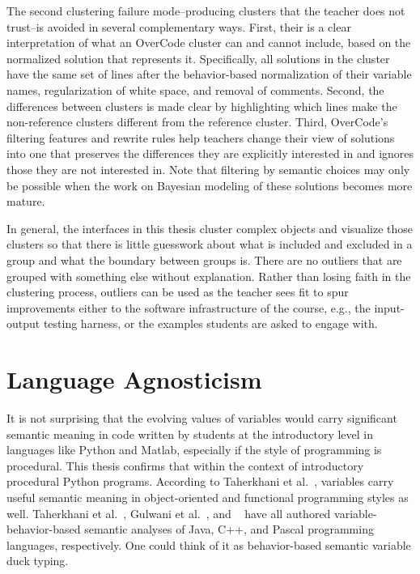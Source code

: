 

The second clustering failure mode--producing clusters that the teacher does not trust--is avoided in several complementary ways. First, their is a clear interpretation of what an OverCode cluster can and cannot include, based on the normalized solution that represents it. Specifically, all solutions in the cluster have the same set of lines after the behavior-based normalization of their variable names, regularization of white space, and removal of comments. Second, the differences between clusters is made clear by highlighting which lines make the non-reference clusters different from the reference cluster. Third, OverCode's filtering features and rewrite rules help teachers change their view of solutions into one that preserves the differences they are explicitly interested in and ignores those they are not interested in. Note that filtering by semantic choices may only be possible when the work on Bayesian modeling of these solutions becomes more mature. 


In general, the interfaces in this thesis cluster complex objects and visualize those clusters so that there is little guesswork about what is included and excluded in a group and what the boundary between groups is. There are no outliers that are grouped with something else without explanation. Rather than losing faith in the clustering process, outliers can be used as the teacher sees fit to spur improvements either to the software infrastructure of the course, e.g., the input-output testing harness, or the examples students are asked to engage with. 

\section{Language Agnosticism}

It is not surprising that the evolving values of variables would carry significant semantic meaning in code written by students at the introductory level in languages like Python and Matlab, especially if the style of programming is procedural. This thesis confirms that within the context of introductory procedural Python programs. According to Taherkhani et al.~\cite{taherkhani2010recognizing}, variables carry useful semantic meaning in object-oriented and functional programming styles as well. Taherkhani et al.~\cite{}, Gulwani et al.~\cite{gulwani_fse14}, and ~\cite{sajaniemi2002empirical} have all authored variable-behavior-based semantic analyses of Java, C++, and Pascal programming languages, respectively. One could think of it as behavior-based semantic variable duck typing. 


